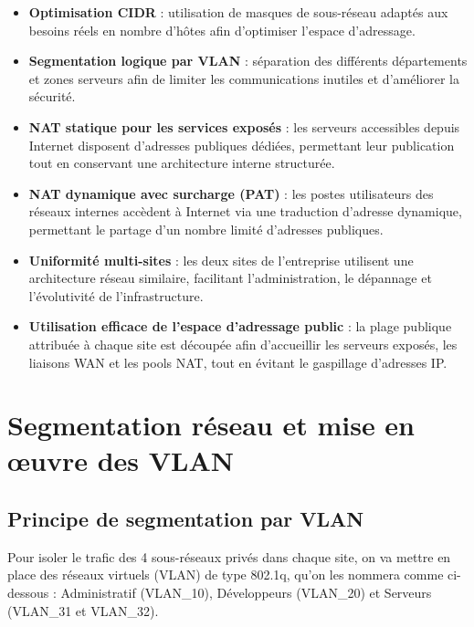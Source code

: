 \documentclass[12pt,a4paper, oneside]{memoir}
\begin{document}
\begin{itemize}
	\item \textbf{Optimisation CIDR} : utilisation de masques de sous-réseau adaptés aux besoins réels en nombre d’hôtes afin d’optimiser l’espace d’adressage.
	
	\item \textbf{Segmentation logique par VLAN} : séparation des différents départements et zones serveurs afin de limiter les communications inutiles et d'améliorer la sécurité.
	
	\item \textbf{NAT statique pour les services exposés} : les serveurs accessibles depuis Internet disposent d’adresses publiques dédiées, permettant leur publication tout en conservant une architecture interne structurée.
	
	\item \textbf{NAT dynamique avec surcharge (PAT)} : les postes utilisateurs des réseaux internes accèdent à Internet via une traduction d’adresse dynamique, permettant le partage d’un nombre limité d’adresses publiques.
	
	\item \textbf{Uniformité multi-sites} : les deux sites de l’entreprise utilisent une architecture réseau similaire, facilitant l’administration, le dépannage et l’évolutivité de l’infrastructure.
	
	\item \textbf{Utilisation efficace de l’espace d’adressage public} : la plage publique attribuée à chaque site est découpée afin d’accueillir les serveurs exposés, les liaisons WAN et les pools NAT, tout en évitant le gaspillage d’adresses IP.
\end{itemize}




\section{Segmentation réseau et mise en œuvre des VLAN}

\subsection{Principe de segmentation par VLAN}
Pour isoler le trafic des 4 sous-réseaux privés dans chaque site, on va mettre en place des réseaux virtuels (VLAN) de type 802.1q, qu'on les nommera comme ci-dessous : Administratif (VLAN_10), Développeurs (VLAN_20) et Serveurs (VLAN_31 et VLAN_32).
\end{document}
